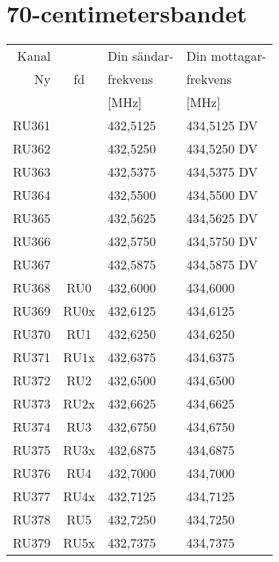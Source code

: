 \section{70-centimetersbandet}


\begin{tabular}{ r | c | l | l }
	Kanal &       & Din sändar-        & Din mottagar-  \\
	Ny    & fd    & frekvens       & frekvens \\
          &       & [\unit{\mega\hertz}] & [\unit{\mega\hertz}] \\
	\hline
	RU361 &       & 432,5125       & 434,5125 DV    \\
	RU362 &       & 432,5250       & 434,5250 DV    \\
	RU363 &       & 432,5375       & 434,5375 DV    \\
	RU364 &       & 432,5500       & 434,5500 DV    \\
	RU365 &       & 432,5625       & 434,5625 DV    \\
	RU366 &       & 432,5750       & 434,5750 DV    \\
	RU367 &       & 432,5875       & 434,5875 DV    \\
	RU368 & RU0   & 432,6000       & 434,6000       \\
	RU369 & RU0x  & 432,6125       & 434,6125       \\
	RU370 & RU1   & 432,6250       & 434,6250       \\
	RU371 & RU1x  & 432,6375       & 434,6375       \\
	RU372 & RU2   & 432,6500       & 434,6500       \\
	RU373 & RU2x  & 432,6625       & 434,6625       \\
	RU374 & RU3   & 432,6750       & 434,6750       \\
	RU375 & RU3x  & 432,6875       & 434,6875       \\
	RU376 & RU4   & 432,7000       & 434,7000       \\
	RU377 & RU4x  & 432,7125       & 434,7125       \\
	RU378 & RU5   & 432,7250       & 434,7250       \\
	RU379 & RU5x  & 432,7375       & 434,7375       \\

\end{tabular}

